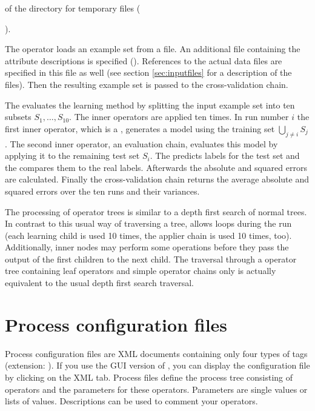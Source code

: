 of the directory for temporary files ({).

The  operator loads an example set from a file. An
additional file containing the attribute descriptions is
specified (). References to the actual data
files are specified in this file as well (see section
\ref{sec:inputfiles} for a description of the files). Then the resulting
example set is passed to the cross-validation chain.

The  evaluates the learning method by splitting 
the input example set into ten subsets $S_{1},\ldots,S_{10}$. 
The inner operators are applied ten times.  In run number $i$ the
first inner operator, which is a , generates a model
using the training set $\bigcup_{j \neq i} S_{j}$. The second inner
operator, an evaluation chain, evaluates this model by applying it to
the remaining test set $S_{i}$. The  predicts labels
for the test set and the  compares them to
the real labels. Afterwards the absolute and squared errors are
calculated. Finally the cross-validation chain returns the average
absolute and squared errors over the ten runs and their variances.

The processing of \rapidminer operator trees is similar to a depth first search of
normal trees. In contrast to this usual way of traversing a tree, \rapidminer allows
loops during the run (each learning child is used 10 times, the applier chain
is used 10 times, too). Additionally, inner nodes may perform some operations
before they pass the output of the first children to the next child. The
traversal through a \rapidminer operator tree containing leaf operators and simple
operator chains only is actually equivalent to the usual depth first search
traversal.



\section{Process configuration files}
\label{configuration_file}

Process configuration files are XML documents containing only four types
of tags (extension: ). If you use the GUI version of \rapidminer, you can display the
configuration file by clicking on the XML tab. Process files define
the process tree consisting of operators and the parameters for
these operators. Parameters are single values or
lists of values. Descriptions can be used to comment your operators.

}

